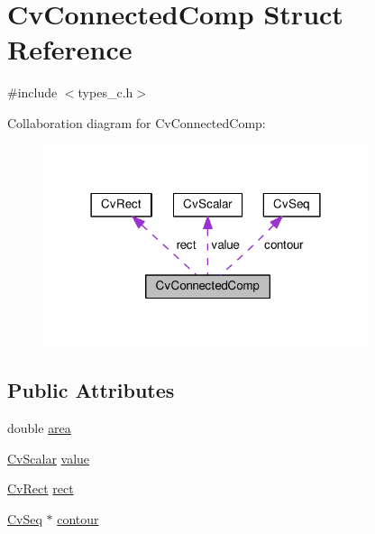 \hypertarget{structCvConnectedComp}{\section{Cv\-Connected\-Comp Struct Reference}
\label{structCvConnectedComp}
}


{\ttfamily \#include $<$types\-\_\-c.\-h$>$}



Collaboration diagram for Cv\-Connected\-Comp\-:\nopagebreak
\begin{figure}[H]
\begin{center}
\leavevmode
\includegraphics[width=270pt]{structCvConnectedComp__coll__graph}
\end{center}
\end{figure}
\subsection*{Public Attributes}
\begin{DoxyCompactItemize}
\item 
double \hyperlink{structCvConnectedComp_affec9c260f6ca4fd3fae028f0ad3d9a4}{area}
\item 
\hyperlink{structCvScalar}{Cv\-Scalar} \hyperlink{structCvConnectedComp_aacf4c20a51f3fc7d8a71c95b46820902}{value}
\item 
\hyperlink{structCvRect}{Cv\-Rect} \hyperlink{structCvConnectedComp_a1f86bb7ed32ddf315d19521e20beabcc}{rect}
\item 
\hyperlink{structCvSeq}{Cv\-Seq} $\ast$ \hyperlink{structCvConnectedComp_ae4f461290aa042a2dcd3b45ae03d9feb}{contour}
\end{DoxyCompactItemize}


